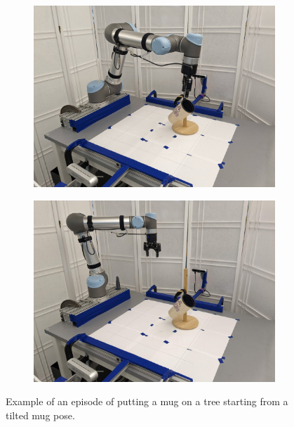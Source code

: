 \documentclass{article}
\begin{document}
\begin{figure}[]
\begin{subfigure}{(\linewidth - 0.05\linewidth)/5}
        \includegraphics[width=\linewidth]{figures/episodes/mug_on_tree/9.jpg}
    \end{subfigure}
    \begin{subfigure}{(\linewidth - 0.05\linewidth)/5}
        \centering
        \includegraphics[width=\linewidth]{figures/episodes/mug_on_tree/10.jpg}
    \end{subfigure}

    \caption{Example of an episode of putting a mug on a tree starting from a tilted mug pose.}
    \label{fig:mug_tree_episode}
\end{figure}
\end{document}

